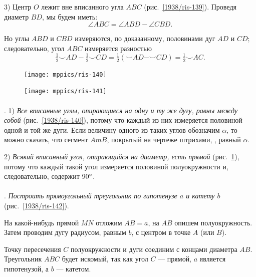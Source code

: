 \documentclass[oneside]{book}
\begin{document}
3) Центр $O$ лежит вне вписанного угла $ABC$ (рис.~\ref{1938/ris-139}).
Проведя диаметр $BD$, мы будем иметь:
\[\angle ABC=\angle ABD-\angle CBD.\]

Но углы $ABD$ и $CBD$ измеряются, по доказанному, половинами дуг $AD$ и $CD$;
следовательно, угол $ABC$ измеряется разностью
\[\tfrac12{\smallsmile}AD-\tfrac12{\smallsmile}CD=\tfrac12({\smallsmile}AD-{\smallsmile}CD)=\tfrac12{\smallsmile}AC.\]

\begin{figure}[h]
\begin{minipage}{.48\textwidth}
\centering
\texttt{[image: mppics/ris-140]}
\caption{}\label{1938/ris-140}
\end{minipage}
\hfill
\begin{minipage}{.48\textwidth}
\centering
\texttt{[image: mppics/ris-141]}
\caption{}\label{1938/ris-141}
\end{minipage}
\end{figure}

\paragraph{}\label{1938/125}
. 
1) \emph{Все вписанные углы, опирающиеся на одну и ту же дугу, равны между собой} (рис.~\ref{1938/ris-140}), потому что каждый из них измеряется половиной одной и той же дуги.
Если величину одного из таких углов обозначим $\alpha$, то можно сказать, что сегмент $AmB$, покрытый на чертеже штрихами, , равный $\alpha$. 

2) \emph{Всякий вписанный угол, опирающийся на диаметр, есть прямой} (рис.~\ref{1938/ris-141}), потому что каждый такой угол измеряется половиной полуокружности и, следовательно, содержит $90\degree$.



\paragraph{}\label{1938/126}
.
\emph{Построить прямоугольный треугольник по гипотенузе $a$ и катету $b$} (рис.~\ref{1938/ris-142}).


На какой-нибудь прямой $MN$ отложим $AB=a$, на $AB$ опишем полуокружность.
Затем проводим дугу радиусом, равным $b$, с центром в точке $A$ (или $B$).

Точку пересечения $C$ полуокружности и дуги соединим с концами диаметра $AB$.
Треугольник $ABC$ будет искомый, так как угол $C$ — прямой, $a$ является гипотенузой, а $b$ — катетом.
\end{document}

